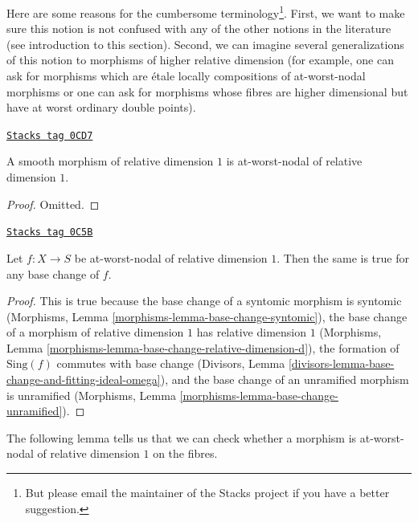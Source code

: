 Here are some reasons for the cumbersome terminology\footnote{But please
email the maintainer of the Stacks project if you have a better suggestion.}.
First, we want to make sure this notion is not confused with any of the
other notions in the literature (see introduction to this section).
Second, we can imagine several generalizations of this notion to morphisms
of higher relative dimension (for example, one can ask for morphisms
which are \'etale locally compositions of at-worst-nodal morphisms or
one can ask for morphisms whose fibres are higher dimensional but have
at worst ordinary double points).

\begin{lemma}
\label{curves-lemma-smooth-relative-dimension-1}
\href{https://stacks.math.columbia.edu/tag/0CD7}{\texttt{Stacks tag 0CD7}}

A smooth morphism of relative dimension $1$ is
at-worst-nodal of relative dimension $1$.
\end{lemma}

\begin{proof}
Omitted.
\end{proof}

\begin{lemma}
\label{curves-lemma-base-change-nodal-family}
\href{https://stacks.math.columbia.edu/tag/0C5B}{\texttt{Stacks tag 0C5B}}

Let $f : X \to S$ be at-worst-nodal of relative dimension $1$.
Then the same is true for any base change of $f$.
\end{lemma}

\begin{proof}
This is true because the base change of a syntomic morphism
is syntomic (Morphisms, Lemma \ref{morphisms-lemma-base-change-syntomic}),
the base change of a morphism of relative dimension $1$ has
relative dimension $1$
(Morphisms, Lemma \ref{morphisms-lemma-base-change-relative-dimension-d}),
the formation of $\text{Sing}(f)$ commutes with base change
(Divisors, Lemma
\ref{divisors-lemma-base-change-and-fitting-ideal-omega}), and
the base change of an unramified morphism is unramified
(Morphisms, Lemma \ref{morphisms-lemma-base-change-unramified}).
\end{proof}

The following lemma tells us that we can check whether a morphism
is at-worst-nodal of relative dimension $1$ on the fibres.

